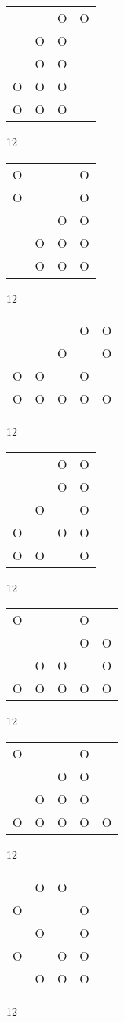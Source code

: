 \begin{tabular}{|m{0.2cm}m{0.2cm}m{0.2cm}m{0.2cm}|}\hline
 & &O&O\\
 &O&O& \\
 &O&O& \\
O&O&O& \\
O&O&O& \\
\hline\end{tabular}12
\begin{tabular}{|m{0.2cm}m{0.2cm}m{0.2cm}m{0.2cm}|}\hline
O& & &O\\
O& & &O\\
 & &O&O\\
 &O&O&O\\
 &O&O&O\\
\hline\end{tabular}12
\begin{tabular}{|m{0.2cm}m{0.2cm}m{0.2cm}m{0.2cm}m{0.2cm}|}\hline
 & & &O&O\\
 & &O& &O\\
O&O& &O& \\
O&O&O&O&O\\
\hline\end{tabular}12
\begin{tabular}{|m{0.2cm}m{0.2cm}m{0.2cm}m{0.2cm}|}\hline
 & &O&O\\
 & &O&O\\
 &O& &O\\
O& &O&O\\
O&O& &O\\
\hline\end{tabular}12
\begin{tabular}{|m{0.2cm}m{0.2cm}m{0.2cm}m{0.2cm}m{0.2cm}|}\hline
O& & &O& \\
 & & &O&O\\
 &O&O& &O\\
O&O&O&O&O\\
\hline\end{tabular}12
\begin{tabular}{|m{0.2cm}m{0.2cm}m{0.2cm}m{0.2cm}m{0.2cm}|}\hline
O& & &O& \\
 & &O&O& \\
 &O&O&O& \\
O&O&O&O&O\\
\hline\end{tabular}12
\begin{tabular}{|m{0.2cm}m{0.2cm}m{0.2cm}m{0.2cm}|}\hline
 &O&O& \\
O& & &O\\
 &O& &O\\
O& &O&O\\
 &O&O&O\\
\hline\end{tabular}12
